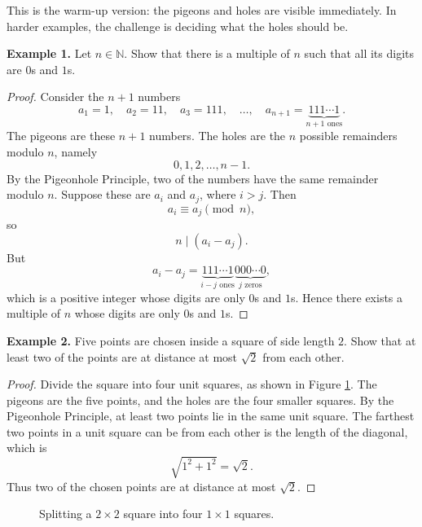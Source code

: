 \documentclass{article}
\begin{document}
This is the warm-up version: the pigeons and holes are visible immediately. In harder examples, the challenge is deciding what the holes should be.

\vspace{2mm}
\noindent\textbf{Example 1.} Let $n\in \mathbb{N}$. Show that there is a multiple of $n$ such that all its digits are $0$s and $1$s.

\begin{proof}
Consider the $n+1$ numbers
\[
    a_1 = 1,\quad a_2 = 11,\quad a_3 = 111,\quad \dots,\quad a_{n+1}=\underbrace{111\cdots 1}_{n+1\text{ ones}}.
\]
The pigeons are these $n+1$ numbers. The holes are the $n$ possible remainders modulo $n$, namely
\[
    0,1,2,\dots,n-1.
\]
By the Pigeonhole Principle, two of the numbers have the same remainder modulo $n$. Suppose these are $a_i$ and $a_j$, where $i>j$. Then
\[
    a_i \equiv a_j \pmod n,
\]
so
\[
    n \mid (a_i-a_j).
\]
But
\[
    a_i-a_j
    = \underbrace{111\cdots 1}_{i-j\text{ ones}}\underbrace{000\cdots 0}_{j\text{ zeros}},
\]
which is a positive integer whose digits are only $0$s and $1$s. Hence there exists a multiple of $n$ whose digits are only $0$s and $1$s.
\end{proof}

\vspace{2mm}
\noindent\textbf{Example 2.} Five points are chosen inside a square of side length $2$. Show that at least two of the points are at distance at most $\sqrt{2}$ from each other.

\begin{proof}
Divide the square into four unit squares, as shown in Figure \ref{fig:square-four}. The pigeons are the five points, and the holes are the four smaller squares. By the Pigeonhole Principle, at least two points lie in the same unit square. The farthest two points in a unit square can be from each other is the length of the diagonal, which is
\[
    \sqrt{1^2+1^2}=\sqrt{2}.
\]
Thus two of the chosen points are at distance at most $\sqrt{2}$.
\end{proof}

\begin{figure}[htbp]
    \centering
    \caption{Splitting a $2\times 2$ square into four $1\times 1$ squares.}
    \label{fig:square-four}
\end{figure}
\end{document}
